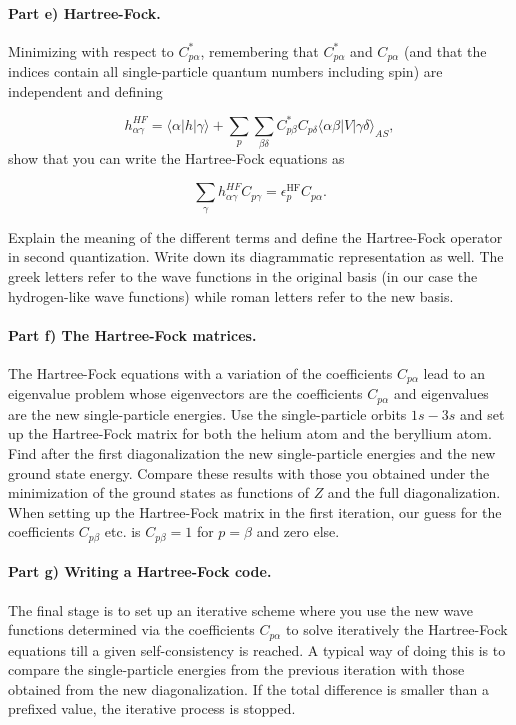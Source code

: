 \documentclass[%
oneside,                 %
final,                   %
10pt]{article}
\begin{document}
\paragraph{Part e) Hartree-Fock.}
Minimizing with respect to $C^*_{p\alpha}$, remembering that
$C^*_{p\alpha}$ and $C_{p\alpha}$ (and that the indices contain all
single-particle quantum numbers including spin) are independent and
defining

\begin{equation*}
h_{\alpha\gamma}^{HF}=\langle \alpha | h | \gamma \rangle+
\sum_{p}\sum_{\beta\delta} C^*_{p\beta}C_{p\delta}\langle \alpha\beta|V|\gamma\delta\rangle_{AS},
\end{equation*}
show that you can write the Hartree-Fock  equations as

\begin{equation*}
\sum_{\gamma}h_{\alpha\gamma}^{HF}C_{p\gamma}=\epsilon_p^{\mathrm{HF}}C_{p\alpha}.
\label{eq:newhf}
\end{equation*}

Explain the meaning of the different terms and define the Hartree-Fock 
operator in second quantization. Write down its diagrammatic representation as well.  The greek letters refer to the wave functions in the original basis (in our case the hydrogen-like wave functions) while roman letters refer to the new basis. 

\paragraph{Part f) The Hartree-Fock matrices.}
The Hartree-Fock equations with a variation of the coefficients
$C_{p\alpha}$ lead to an eigenvalue problem whose eigenvectors are the
coefficients $C_{p\alpha}$ and eigenvalues are the new single-particle
energies.  Use the single-particle orbits $1s-3s$ and set up the
Hartree-Fock matrix for both the helium atom and the beryllium
atom. Find after the first diagonalization the new single-particle
energies and the new ground state energy.  Compare these results with
those you obtained under the minimization of the ground states as
functions of $Z$ and the full diagonalization. When setting up the
Hartree-Fock matrix in the first iteration, our guess for the
coefficients $C_{p\beta}$ etc. is $C_{p\beta}=1$ for $p=\beta$ and
zero else.


\paragraph{Part g) Writing a Hartree-Fock code.}
The final stage is to set up an iterative scheme where you use the new
wave functions determined via the coefficients $C_{p\alpha}$ to solve
iteratively the Hartree-Fock equations till a given self-consistency
is reached. A typical way of doing this is to compare the
single-particle energies from the previous iteration with those
obtained from the new diagonalization. If the total difference is
smaller than a prefixed value, the iterative process is stopped.
\end{document}
